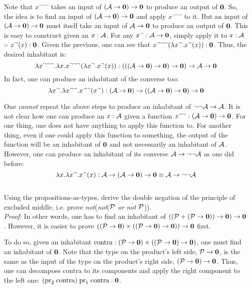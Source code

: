 Note that $x^{\neg\neg\neg}$ takes an input of $(\mathcal{A} \to \textbf{0}) \to \textbf{0}$ to produce an output of $\textbf{0}$. So, the idea is to find an input of $(\mathcal{A} \to \textbf{0}) \to \textbf{0}$ and apply $x^{\neg\neg\neg}$ to it. But an input of $(\mathcal{A} \to \textbf{0}) \to \textbf{0}$ must itself take an input of $\mathcal{A} \to \textbf{0}$ to produce an output of $\textbf{0}$. This is easy to construct given an $x : \mathcal{A}$. For any $x^{\neg} : \mathcal{A} \to \textbf{0}$, simply apply it to $x : \mathcal{A}$ :- $x^{\neg}(x) : \textbf{0}$.
Given the previous, one can see that $x^{\neg\neg\neg}(\lambda x^{\neg} . x^{\neg}(x)) : \textbf{0}$. Thus, the desired inhabitant is:
\[
	\lambda x^{\neg\neg\neg} . \lambda x . x^{\neg\neg\neg}(\lambda x^{\neg} . x^{\neg}(x)) : (((\mathcal{A} \to \textbf{0}) \to \textbf{0}) \to \textbf{0}) \to \mathcal{A} \to \textbf{0}
\]
In fact, one can produce an inhabitant of the converse too:
\[
	\lambda x^{\neg} . \lambda x^{\neg\neg} . x^{\neg\neg}(x^{\neg}) : (\mathcal{A} \to \textbf{0}) \to ((\mathcal{A} \to \textbf{0}) \to \textbf{0}) \to \textbf{0}
\]

 One \textit{cannot} repeat the above steps to produce an inhabitant of $\neg\neg \mathcal{A} \to \mathcal{A}$. It is not clear how one can produce an $x : \mathcal{A}$ given a function $x^{\neg\neg} : (\mathcal{A} \to \textbf{0}) \to \textbf{0}$. For one thing, one does not have anything to apply this function to. For another thing, even if one could apply this function to something, the output of the function will be an inhabitant of $\textbf{0}$ and not necessarily an inhabitant of $\mathcal{A}$. However, one can produce an inhabitant of its converse $\mathcal{A} \to \neg\neg \mathcal{A}$ as one did before:
\[
	\lambda x . \lambda x^{\neg} . x^{\neg}(x) : \mathcal{A} \to (\mathcal{A} \to \textbf{0}) \to \textbf{0} \equiv \mathcal{A} \to \neg\neg \mathcal{A}
\] \\



 Using the propositions-as-types, derive the double negation of the principle of excluded middle, i.e. prove \textit{not}(\textit{not}($\mathcal{P}$ \textit{or} \textit{not} $\mathcal{P}$)). \\


\textit{Proof:} In other words, one has to find an inhabitant of $((\mathcal{P} + (\mathcal{P} \to \textbf{0})) \to \textbf{0}) \to \textbf{0}$. However, it is easier to prove $((\mathcal{P} \to \textbf{0}) \times ((\mathcal{P} \to \textbf{0}) \to \textbf{0})) \to \textbf{0}$ first.

To do so, given an inhabitant $\text{contra} : (\mathcal{P} \to \textbf{0}) \times ((\mathcal{P} \to \textbf{0}) \to \textbf{0})$, one must find an inhabitant of $\textbf{0}$. Note that the type on the product's left side, $\mathcal{P} \to \textbf{0}$, is the same as the input of the type on the product's right side, $(\mathcal{P} \to \textbf{0}) \to \textbf{0}$. Thus, one can decompose $\text{contra}$ to its components and apply the right component to the left one: $(\text{pr}_{2}\;\text{contra})\;\text{pr}_{1}\;\text{contra} : \textbf{0}$.

